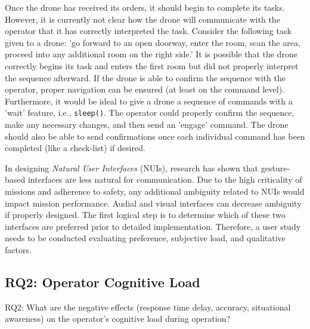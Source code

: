 Once the drone has received its orders, it should begin to complete its tasks. However, it is currently not clear how the drone will communicate with the operator that it has correctly interpreted the task. Consider the following task given to a drone: 'go forward to an open doorway, enter the room, scan the area, proceed into any additional room on the right side.' It is possible that the drone correctly begins its task and enters the first room but did not properly interpret the sequence afterward. If the drone is able to confirm the sequence with the operator, proper navigation can be ensured (at least on the command level). Furthermore, it would be ideal to give a drone a sequence of commands with a 'wait' feature, i.e., \texttt{sleep()}. The operator could properly confirm the sequence, make any necessary changes, and then send an 'engage' command. The drone should also be able to send confirmations once each individual command has been completed (like a check-list) if desired. 
\smallskip

In designing \textit{Natural User Interfaces} (NUIs), research has shown that gesture-based interfaces are less natural for communication. Due to the high criticality of missions and adherence to safety, any additional ambiguity related to NUIs would impact mission performance. Audial and visual interfaces can decrease ambiguity if properly designed. The first logical step is to determine which of these two interfaces are preferred prior to detailed implementation. Therefore, a user study needs to be conducted evaluating preference, subjective load, and qualitative factors. 



\subsection{RQ2: Operator Cognitive Load}
\noindent RQ2: What are the negative effects (response time delay, accuracy, situational awareness) on the operator's cognitive load during operation?
\smallskip

